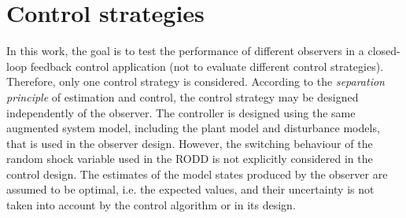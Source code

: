 %
%


\section{Control strategies}

In this work, the goal is to test the performance of different observers in a closed-loop feedback control application (not to evaluate different control strategies). Therefore, only one control strategy is considered. According to the \textit{separation principle} of estimation and control, the control strategy may be designed independently of the observer. The controller is designed using the same augmented system model, including the plant model and disturbance models, that is used in the observer design. However, the switching behaviour of the random shock variable used in the \gls{RODD} is not explicitly considered in the control design. The estimates of the model states produced by the observer are assumed to be optimal, i.e. the expected values, and their uncertainty is not taken into account by the control algorithm or in its design.


